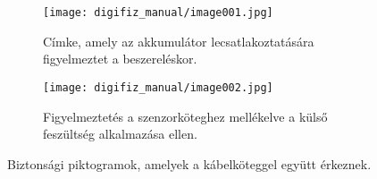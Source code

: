 \begin{figure}[htbp]
    \centering
    \begin{subfigure}{0.46\textwidth}
        \texttt{[image: digifiz\_manual/image001.jpg]}
        \caption{Címke, amely az akkumulátor lecsatlakoztatására figyelmeztet a beszereléskor.}
    \end{subfigure}\hfill
    \begin{subfigure}{0.46\textwidth}
        \texttt{[image: digifiz\_manual/image002.jpg]}
        \caption{Figyelmeztetés a szenzorköteghez mellékelve a külső feszültség alkalmazása ellen.}
    \end{subfigure}
    \caption{Biztonsági piktogramok, amelyek a kábelköteggel együtt érkeznek.}
\end{figure}

